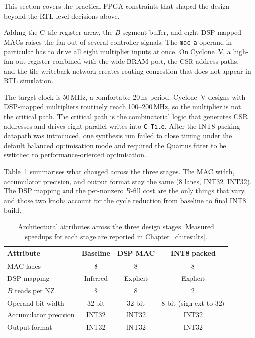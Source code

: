 This section covers the practical FPGA constraints that shaped the design
beyond the RTL-level decisions above.

Adding the C-tile register array, the $B$-segment buffer, and eight
DSP-mapped MACs raises the fan-out of several controller signals. The
\texttt{mac\_a} operand in particular has to drive all eight multiplier
inputs at once. On Cyclone~V, a high-fan-out register combined with the
wide BRAM port, the CSR-address paths, and the tile writeback network
creates routing congestion that does not appear in RTL simulation.

The target clock is 50\,MHz, a comfortable 20\,ns period. Cyclone~V designs
with DSP-mapped multipliers routinely reach 100--200\,MHz, so the multiplier
is not the critical path. The critical path is the combinatorial logic that
generates CSR addresses and drives eight parallel writes into
\texttt{C\_Tile}. After the INT8 packing datapath was introduced, one
synthesis run failed to close timing under the default balanced
optimisation mode and required the Quartus fitter to be switched to
performance-oriented optimisation.

Table~\ref{tab:design-evolution} summarises what changed across the three
stages. The MAC width, accumulator precision, and output format stay the
same (8 lanes, INT32, INT32). The DSP mapping and the per-nonzero $B$-fill
cost are the only things that vary, and those two knobs account for the
cycle reduction from baseline to final INT8 build.

\begin{table}[t]
  \centering
  \small
  \begin{tabular}{p{6.0cm}ccc}
  \toprule
  Attribute & Baseline & DSP MAC & INT8 packed \\
  \midrule
  MAC lanes              & 8        & 8        & 8 \\
  DSP mapping            & Inferred & Explicit & Explicit \\
  $B$ reads per NZ       & 8        & 8        & 2 \\
  Operand bit-width      & 32-bit   & 32-bit   & 8-bit (sign-ext to 32) \\
  Accumulator precision  & INT32    & INT32    & INT32 \\
  Output format          & INT32    & INT32    & INT32 \\
  \bottomrule
  \end{tabular}
  \caption{Architectural attributes across the three design stages.
           Measured speedups for each stage are reported in
           Chapter~\ref{ch:results}.}
  \label{tab:design-evolution}
\end{table}
